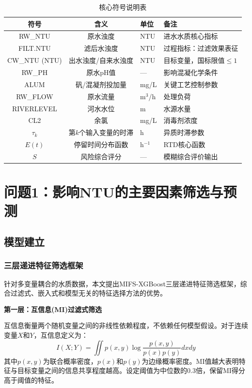 \documentclass[12pt,a4paper]{ctexart}
\begin{document}
\begin{table}[H]
\centering
\caption{核心符号说明表}
\label{tab:symbols}
\small
\begin{tabular}{ccll}
\toprule
\textbf{符号} & \textbf{含义} & \textbf{单位} & \textbf{备注} \\
\midrule
RW\_NTU & 原水浊度 & NTU & 进水水质核心指标 \\
FILT.NTU & 滤后水浊度 & NTU & 过程指标：过滤效果表征 \\
CW\_NTU (NTU) & 出水浊度/自来水浊度 & NTU & 目标变量，国标限值$\leq 1$ \\
RW\_PH & 原水pH值 & — & 影响混凝化学条件 \\
ALUM & 矾/混凝剂投加量 & mg/L & 关键工艺控制参数 \\
RW\_FLOW & 原水流量 & m$^3$/h & 处理负荷 \\
RIVERLEVEL & 河水水位 & m & 水源水量 \\
CL2 & 余氯 & mg/L & 消毒剂浓度 \\
$\tau_k$ & 第$k$个输入变量的时滞 & h & 异质时滞参数 \\
$E(t)$ & 停留时间分布函数 & h$^{-1}$ & RTD核心函数 \\
$S$ & 风险综合评分 & — & 模糊综合评价输出 \\
\bottomrule
\end{tabular}
\end{table}

\newpage

\section{问题1：影响NTU的主要因素筛选与预测}

\subsection{模型建立}

\subsubsection{三层递进特征筛选框架}

针对多变量耦合的水质数据，本文提出MIFS-XGBoost三层递进特征筛选框架，综合过滤式、嵌入式和模型无关的特征选择方法的优势。

\textbf{第一层：互信息(MI)过滤式筛选}

互信息衡量两个随机变量之间的非线性依赖程度，不依赖任何模型假设。对于连续变量$X$和$Y$，互信息定义为：
\begin{equation}
I(X;Y) = \iint p(x,y) \log\frac{p(x,y)}{p(x)p(y)} dxdy
\label{eq:mi}
\end{equation}
其中$p(x,y)$为联合概率密度，$p(x)$和$p(y)$为边缘概率密度。MI值越大表明特征与目标变量之间的信息共享程度越高。设定阈值为中位数的0.3倍，保留MI得分高于阈值的特征。
\end{document}
